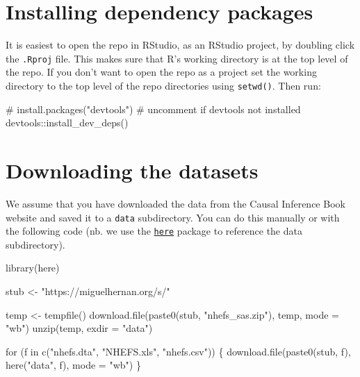 \documentclass[
  10pt,
  a4paper,
]{book}
\newenvironment{Shaded}{\begin{snugshade}}{\end{snugshade}}
\newcommand{\AttributeTok}[1]{\textcolor[rgb]{0.40,0.45,0.13}{#1}}
\newcommand{\CommentTok}[1]{\textcolor[rgb]{0.37,0.37,0.37}{#1}}
\newcommand{\ControlFlowTok}[1]{\textcolor[rgb]{0.00,0.46,0.62}{#1}}
\newcommand{\FunctionTok}[1]{\textcolor[rgb]{0.28,0.35,0.67}{#1}}
\newcommand{\NormalTok}[1]{\textcolor[rgb]{0.00,0.46,0.62}{#1}}
\newcommand{\OtherTok}[1]{\textcolor[rgb]{0.00,0.46,0.62}{#1}}
\newcommand{\SpecialCharTok}[1]{\textcolor[rgb]{0.37,0.37,0.37}{#1}}
\newcommand{\StringTok}[1]{\textcolor[rgb]{0.13,0.47,0.30}{#1}}
\begin{document}
\section{Installing dependency packages}\label{installing-dependency-packages}

It is easiest to open the repo in RStudio, as an RStudio project, by doubling click the \texttt{.Rproj} file. This makes sure that R's working directory is at the top level of the repo. If you don't want to open the repo as a project set the working directory to the top level of the repo directories using \texttt{setwd()}. Then run:

\begin{Shaded}
\begin{Highlighting}[]
\CommentTok{\# install.packages("devtools") \# uncomment if devtools not installed}
\NormalTok{devtools}\SpecialCharTok{::}\FunctionTok{install\_dev\_deps}\NormalTok{()}
\end{Highlighting}
\end{Shaded}

\section{Downloading the datasets}\label{downloading-the-datasets}

We assume that you have downloaded the data from the Causal Inference Book website and saved it to a \texttt{data} subdirectory. You can do this manually or with the following code (nb. we use the \href{https://here.r-lib.org/}{\texttt{here}} package to reference the data subdirectory).

\begin{Shaded}
\begin{Highlighting}[]
\FunctionTok{library}\NormalTok{(here)}
\end{Highlighting}
\end{Shaded}

\begin{Shaded}
\begin{Highlighting}[]
\NormalTok{stub }\OtherTok{\textless{}{-}} \StringTok{"https://miguelhernan.org/s/"}

\NormalTok{temp }\OtherTok{\textless{}{-}} \FunctionTok{tempfile}\NormalTok{()}
\FunctionTok{download.file}\NormalTok{(}\FunctionTok{paste0}\NormalTok{(stub, }\StringTok{"nhefs\_sas.zip"}\NormalTok{), temp, }\AttributeTok{mode =} \StringTok{"wb"}\NormalTok{)}
\FunctionTok{unzip}\NormalTok{(temp, }\AttributeTok{exdir =} \StringTok{"data"}\NormalTok{)}

\ControlFlowTok{for}\NormalTok{ (f }\ControlFlowTok{in} \FunctionTok{c}\NormalTok{(}\StringTok{"nhefs.dta"}\NormalTok{, }\StringTok{"NHEFS.xls"}\NormalTok{, }\StringTok{"nhefs.csv"}\NormalTok{)) \{}
  \FunctionTok{download.file}\NormalTok{(}\FunctionTok{paste0}\NormalTok{(stub, f), }\FunctionTok{here}\NormalTok{(}\StringTok{"data"}\NormalTok{, f), }\AttributeTok{mode =} \StringTok{"wb"}\NormalTok{)}
\NormalTok{\}}
\end{Highlighting}
\end{Shaded}
\end{document}
